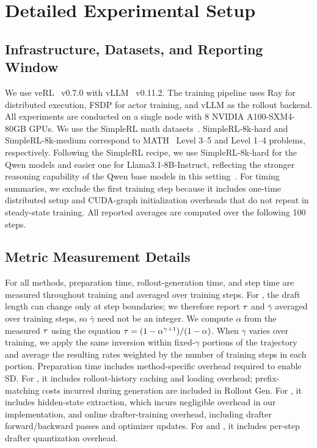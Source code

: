 \section{Detailed Experimental Setup}
\label{app:experimental_setup}

\subsection{Infrastructure, Datasets, and Reporting Window}
\label{app:infra_dataset_reporting}

We use veRL~\cite{sheng2025hybridflow} v0.7.0 with vLLM~\cite{kwon2023efficient} v0.11.2.
The training pipeline uses Ray for distributed execution, FSDP for actor training, and vLLM as the rollout backend.
All experiments are conducted on a single node with 8 NVIDIA A100-SXM4-80GB GPUs.
We use the SimpleRL math datasets~\cite{zeng2025simplerl}.
SimpleRL-8k-hard and SimpleRL-8k-medium correspond to MATH~\cite{hendrycks2021measuring} Level 3--5 and Level 1--4 problems, respectively.
Following the SimpleRL recipe, we use SimpleRL-8k-hard for the Qwen models and easier one for Llama3.1-8B-Instruct, reflecting the stronger reasoning capability of the Qwen base models in this setting~\cite{zeng2025simplerl}.
For timing summaries, we exclude the first training step because it includes one-time distributed setup and CUDA-graph initialization overheads that do not repeat in steady-state training.
All reported averages are computed over the following 100 steps.


\subsection{Metric Measurement Details}
\label{app:metric_measurement}

For all methods, preparation time, rollout-generation time, and step time are measured throughout training and averaged over training steps.
For \methodtitle{}, the draft length can change only at step boundaries; we therefore report $\tau$ and $\bar{\gamma}$ averaged over training steps, so $\bar{\gamma}$ need not be an integer.
We compute $\alpha$ from the measured $\tau$ using the equation $\tau=(1-\alpha^{\gamma+1})/(1-\alpha)$.
When $\gamma$ varies over training, we apply the same inversion within fixed-$\gamma$ portions of the trajectory and average the resulting rates weighted by the number of training steps in each portion.
Preparation time includes method-specific overhead required to enable SD.
For \history{}, it includes rollout-history caching and loading overhead; prefix-matching costs incurred during generation are included in Rollout Gen.
For \Learned{}, it includes hidden-state extraction, which incurs negligible overhead in our implementation, and online drafter-training overhead, including drafter forward/backward passes and optimizer updates.
For \alwayssd{} and \methodtitle{}, it includes per-step drafter quantization overhead.


